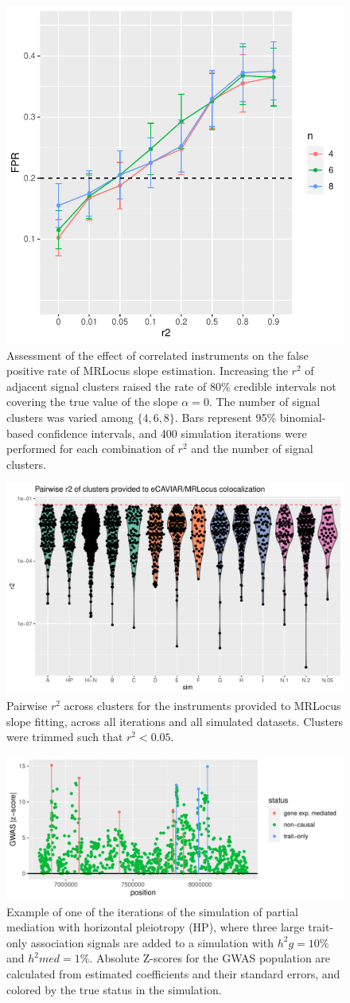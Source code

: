 \documentclass[11pt]{article}
\begin{document}
\begin{figure}[!ht]
  \centering
  \includegraphics[width=.5\textwidth]{figs/corr_instr_sim}
  \caption{Assessment of the effect of correlated instruments on the
    false positive rate of MRLocus slope estimation. Increasing the
    $r^2$ of adjacent signal clusters raised the rate of 80\% credible
    intervals not covering the true value of the slope $\alpha =
    0$. The number of signal clusters was varied among $\{4,6,8\}$.
    Bars represent 95\% binomial-based confidence intervals, and 400
    simulation iterations were performed for each combination of $r^2$
    and the number of signal clusters.}
\end{figure}

\begin{figure}[!ht]
  \centering
  \includegraphics[width=.5\textwidth]{figs/sim_cluster_r2}
  \caption{Pairwise $r^2$ across clusters for the instruments provided
    to MRLocus slope fitting, across all iterations and all simulated
    datasets. Clusters were trimmed such that $r^2 < 0.05$.}
\end{figure}

\begin{figure}[!ht]
  \centering
  \includegraphics[width=.7\textwidth]{figs/hp_example}
  \caption{Example of one of the iterations of the simulation of
    partial mediation with horizontal pleiotropy (HP), where three
    large trait-only association signals are added to a simulation
    with $h^2g = 10\%$ and $h^2med = 1\%$. Absolute Z-scores for the
    GWAS population are calculated from estimated coefficients and
    their standard errors, and colored by the true status in the
    simulation.}
  \label{sf:hp}
\end{figure}
\end{document}
